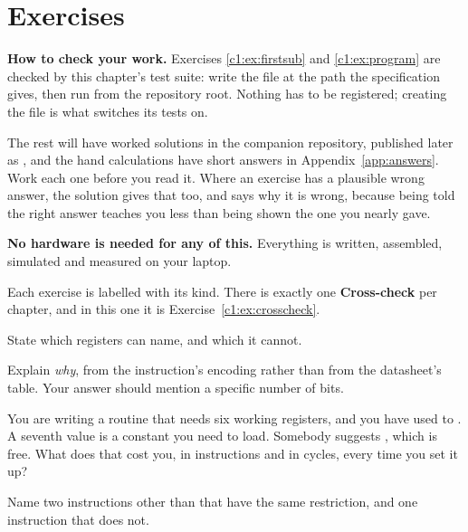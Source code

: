 
\section{Exercises}
\label{c1:sec:exercises}

\begin{aside}
\textbf{How to check your work.} Exercises \ref{c1:ex:firstsub} and \ref{c1:ex:program} are checked by
this chapter's test suite: write the file at the path the specification gives, then run
 from the repository root. Nothing has to be registered; creating the file is what
switches its tests on.

The rest will have worked solutions in the companion repository, published later as
, and the hand calculations have short answers in
Appendix~\ref{app:answers}. Work each one before you read it. Where an exercise
has a plausible wrong answer, the solution gives that too, and says why
it is wrong, because being told the right answer teaches you less than being shown the one you
nearly gave.

\textbf{No hardware is needed for any of this.} Everything is written, assembled, simulated and
measured on your laptop.
\end{aside}

Each exercise is labelled with its kind. There is exactly one \textbf{Cross-check} per chapter,
and in this one it is Exercise~\ref{c1:ex:crosscheck}.

\label{c1:ex:upper}
\begin{parts}
  \item State which registers  can name, and which it cannot.
  \item Explain \emph{why}, from the instruction's encoding rather than from the datasheet's
    table. Your answer should mention a specific number of bits.
  \item You are writing a routine that needs six working registers, and you have used 
    to . A seventh value is a constant you need to load. Somebody suggests ,
    which is free. What does that cost you, in instructions and in cycles, every time you set it
    up?
  \item Name two instructions other than  that have the same restriction, and one
    instruction that does not.
\end{parts}

